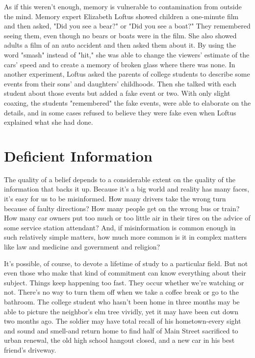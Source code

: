 \documentclass{book}
\begin{document}
As if this weren’t enough, memory is vulnerable to contamination from outside the mind. Memory expert Elizabeth Loftus showed children a one-minute film and then asked, "Did you see a bear?" or "Did you see a boat?" They remembered seeing them, even though no bears or boats were in the film. She also showed adults a film of an auto accident and then asked them about it. By using the word "smash" instead of "hit," she was able to change the viewers’ estimate of the cars’ speed and to create a memory of broken glass where there was none. In another experiment, Loftus asked the parents of college students to describe some events from their sons’ and daughters’ childhoods. Then she talked with each student about those events but added a fake event or two. With only slight coaxing, the students "remembered" the fake events, were able to elaborate on the details, and in some cases refused to believe they were fake even when Loftus explained what she had done.

\section{Deficient Information}

The quality of a belief depends to a considerable extent on the quality of the information that backs it up. Because it’s a big world and reality has many faces, it’s easy for us to be misinformed. How many drivers take the wrong turn because of faulty directions? How many people get on the wrong bus or train? How many car owners put too much or too little air in their tires on the advice of some service station attendant? And, if misinformation is common enough in such relatively simple matters, how much more common is it in complex matters like law and medicine and government and religion?

It’s possible, of course, to devote a lifetime of study to a particular field. But not even those who make that kind of commitment can know everything about their subject. Things keep happening too fast. They occur whether we’re watching or not. There’s no way to turn them off when we take a coffee break or go to the bathroom. The college student who hasn’t been home in three months may be able to picture the neighbor’s elm tree vividly, yet it may have been cut down two months ago. The soldier may have total recall of his hometown-every sight and sound and smell-and return home to find half of Main Street sacrificed to urban renewal, the old high school hangout closed, and a new car in his best friend’s driveway.
\end{document}
